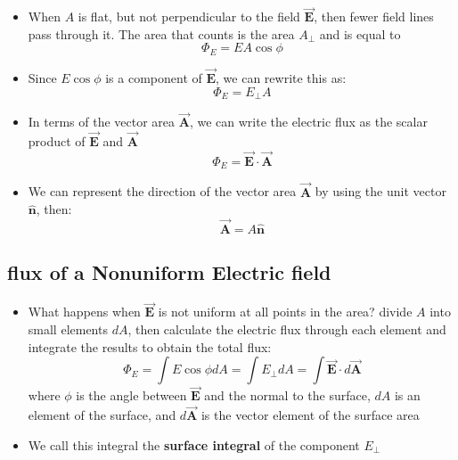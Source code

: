 \documentclass[11pt, a4paper]{article}
\begin{document}
\begin{itemize}
    \item When $A$ is flat, but not perpendicular to the field $\vec{\mathbf{E}}$, then
        fewer field lines pass through it. The area that counts is the area $A_{\perp}$
        and is equal to
        \begin{equation}
            \Phi_E = EA\cos\phi
        \end{equation}
    \item Since $E\cos\phi$ is a component of $\vec{\mathbf{E}}$, we can rewrite this as:
        \begin{equation}
            \Phi_E = E_{\perp}A
        \end{equation}
    \item In terms of the vector area $\vec{\mathbf{A}}$, we can write the electric flux
        as the scalar product of $\vec{\mathbf{E}}$ and $\vec{\mathbf{A}}$
        \begin{equation}
            \Phi_E = \vec{\mathbf{E}} \cdot \vec{\mathbf{A}}
        \end{equation}
    \item We can represent the direction of the vector area $\vec{\mathbf{A}}$ by using
        the unit vector $\hat{\mathbf{n}}$, then:
        \begin{equation}
            \vec{\mathbf{A}} = A\hat{\mathbf{n}}
        \end{equation}
\end{itemize}

\subsection{flux of a Nonuniform Electric field}
\begin{itemize}
    \item What happens when $\vec{\mathbf{E}}$ is not uniform at all points in the area?
        divide $A$ into small elements $dA$, then calculate the electric flux through
        each element and integrate the results to obtain the total flux:
        \begin{equation}
            \Phi_E = \int E\cos\phi dA = \int E_\perp dA =
            \int \vec{\mathbf{E}} \cdot d\vec{\mathbf{A}}
        \end{equation}
        where $\phi$ is the angle between $\vec{\mathbf{E}}$ and the normal to the
        surface, $dA$ is an element of the surface, and $d \vec{\mathbf{A}}$ is the
        vector element of the surface area
    \item We call this integral the \textbf{surface integral} of the component $E_\perp$
\end{itemize}
\end{document}
